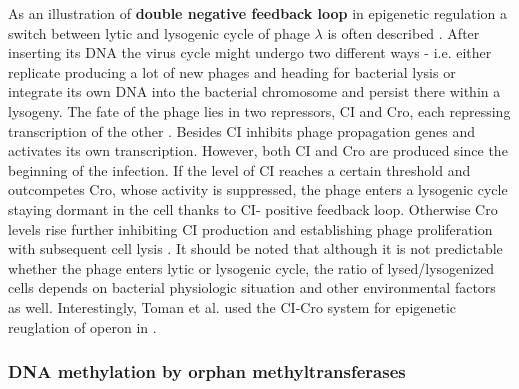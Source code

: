 As an illustration of \textbf{double negative feedback loop} in epigenetic regulation a switch between lytic and lysogenic cycle of  phage $\lambda$ is often described \cite{smits2006phenotypic, casadesus2013programmed}.
After inserting its DNA the virus cycle might undergo two different ways - i.e. either replicate producing a lot of new phages and heading for bacterial lysis or integrate its own DNA into the bacterial chromosome and persist there within a lysogeny.
The fate of the phage lies in two repressors, CI and Cro, each repressing transcription of the other \cite{eisen1970regulation, neubauer1970immunity}.
Besides CI inhibits phage propagation genes and activates its own transcription.
However, both CI and Cro are produced since the beginning of the infection.
If the level of CI reaches a certain threshold and outcompetes Cro, whose activity is suppressed, the phage enters a lysogenic cycle staying dormant in the cell thanks to CI- positive feedback loop.
Otherwise Cro levels rise further inhibiting CI production and establishing phage proliferation with subsequent cell lysis \cite{svenningsen2005role}.
It should be noted that although it is not predictable whether the phage enters lytic or lysogenic cycle, the ratio of lysed/lysogenized cells depends on bacterial physiologic situation and other environmental factors as well.
Interestingly, Toman et al. used the CI-Cro system for epigenetic reuglation of  operon in  \cite{toman1985system}.



\subsubsection{DNA methylation by orphan methyltransferases}

